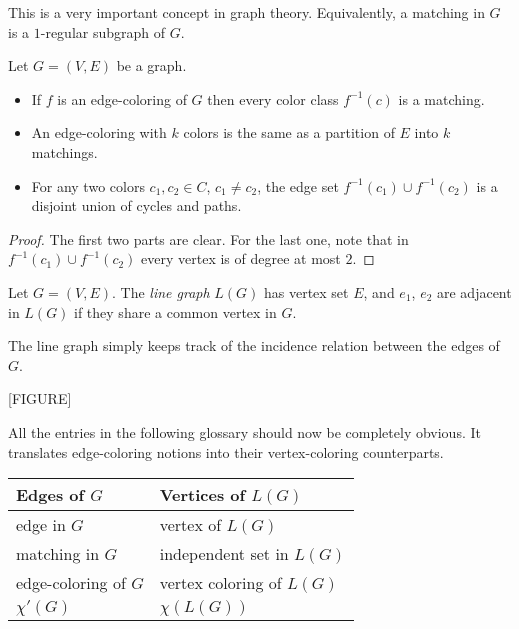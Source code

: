 This is a very important concept in graph theory. Equivalently, a matching in $G$ is a $1$-regular subgraph of $G$. 

\begin{proposition}
Let $G=(V,E)$ be a graph.
\begin{itemize}
\item If $f$ is an edge-coloring of $G$ then every color class $f^{-1}(c)$ is a matching.
\item An edge-coloring with $k$ colors is the same as a partition of $E$ into $k$ matchings.
\item For any two colors $c_1,c_2\in C$, $c_1\neq c_2$, the edge set $f^{-1}(c_1)\cup f^{-1}(c_2)$ is a disjoint union of cycles and paths.
\end{itemize}
\end{proposition}
\begin{proof}
The first two parts are clear. For the last one, note that in $f^{-1}(c_1)\cup f^{-1}(c_2)$ every vertex is of degree at most $2$.
\end{proof}

\begin{definition}
Let $G=(V,E)$. The \emph{line graph} $L(G)$ has vertex set $E$, and $e_1$, $e_2$ are adjacent in $L(G)$ if they share a common vertex in $G$.
\end{definition}

\begin{example}
The line graph simply keeps track of the incidence relation between the edges of $G$. 

[FIGURE]
\end{example}

All the entries in the following glossary should now be completely obvious. It translates edge-coloring notions into their vertex-coloring counterparts.

\begin{center}
\begin{tabular}{l|l}
Edges of $G$ & Vertices of $L(G)$ \\
\hline
{edge in $G$} & {vertex of $L(G)$} \\
{matching in $G$} & {independent set in $L(G)$} \\
{edge-coloring of $G$} & {vertex coloring of $L(G)$} \\
{$\chi'(G)$} &  {$\chi(L(G))$} 
\end{tabular}
\end{center}

